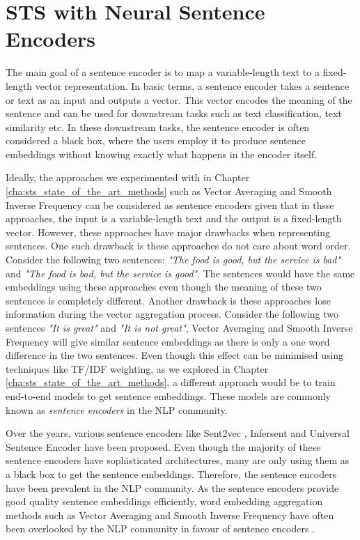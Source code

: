 \chapter{\label{cha:sts_sentence_encoders}STS with Neural Sentence Encoders}

The main goal of a sentence encoder is to map a variable-length text to a fixed-length vector representation. In basic terms, a sentence encoder takes a sentence or text as an input and outputs a vector. This vector encodes the meaning of the sentence and can be used for downstream tasks such as text classification, text similarity etc. In these downstream tasks, the sentence encoder is often considered a black box, where the users employ it to produce sentence embeddings without knowing exactly what happens in the encoder itself. 

Ideally, the approaches we experimented with in Chapter \ref{cha:sts_state_of_the_art_methods} such as Vector Averaging \autocite{mitchell-lapata-2008-vector} and Smooth Inverse Frequency \autocite{DBLP:conf/iclr/AroraLM17} can be considered as sentence encoders given that in thsse approaches, the input is a variable-length text and the output is a fixed-length vector. However, these approaches have major drawbacks when representing sentences. One such drawback is these approaches do not care about word order. Consider the following two sentences: \textit{"The food is good, but the service is bad"} and \textit{"The food is bad, but the service is good"}. The sentences would have the same embeddings using these approaches even though the meaning of these two sentences is completely different. Another drawback is these approaches lose information during the vector aggregation process. Consider the following two sentences \textit{"It is great"} and \textit{"It is not great"}, Vector Averaging and Smooth Inverse Frequency will give similar sentence embeddings as there is only a one word difference in the two sentences. Even though this effect can be minimised using techniques like TF/IDF weighting, as we explored in Chapter \ref{cha:sts_state_of_the_art_methods}, a different approach would be to train end-to-end models to get sentence embeddings. These models are commonly known as \textit{sentence encoders} in the NLP community.

Over the years, various sentence encoders like Sent2vec \autocite{pagliardini-etal-2018-unsupervised}, Infersent  \autocite{cer2018universal} and Universal Sentence Encoder \autocite{conneau-EtAl:2017:EMNLP2017} have been proposed. Even though the majority of these sentence encoders have sophisticated architectures, many are only using them as a black box to get the sentence embeddings. Therefore, the sentence encoders have been prevalent in the NLP community. As the sentence encoders provide good quality sentence embeddings efficiently, word embedding aggregation methods such as Vector Averaging \autocite{mitchell-lapata-2008-vector} and Smooth Inverse Frequency \autocite{mitchell-lapata-2008-vector} have often been overlooked by the NLP community in favour of sentence encoders \autocite{logeswaran2018an}. 


